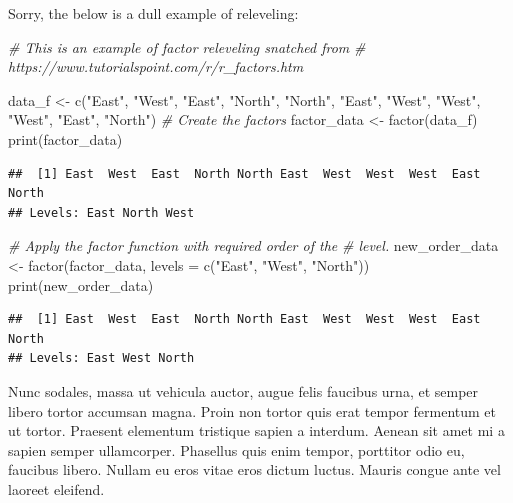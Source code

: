 \documentclass[]{elsarticle} %
\newenvironment{Shaded}{\begin{snugshade}}{\end{snugshade}}
\newcommand{\AttributeTok}[1]{\textcolor[rgb]{0.77,0.63,0.00}{#1}}
\newcommand{\CommentTok}[1]{\textcolor[rgb]{0.56,0.35,0.01}{\textit{#1}}}
\newcommand{\FunctionTok}[1]{\textcolor[rgb]{0.00,0.00,0.00}{#1}}
\newcommand{\NormalTok}[1]{#1}
\newcommand{\OtherTok}[1]{\textcolor[rgb]{0.56,0.35,0.01}{#1}}
\newcommand{\StringTok}[1]{\textcolor[rgb]{0.31,0.60,0.02}{#1}}
\begin{document}
Sorry, the below is a dull example of releveling:

\begin{Shaded}
\begin{Highlighting}[]
\CommentTok{\# This is an example of factor releveling snatched from}
\CommentTok{\# https://www.tutorialspoint.com/r/r\_factors.htm}

\NormalTok{data\_f }\OtherTok{\textless{}{-}} \FunctionTok{c}\NormalTok{(}\StringTok{"East"}\NormalTok{, }\StringTok{"West"}\NormalTok{, }\StringTok{"East"}\NormalTok{, }\StringTok{"North"}\NormalTok{, }\StringTok{"North"}\NormalTok{, }\StringTok{"East"}\NormalTok{,}
    \StringTok{"West"}\NormalTok{, }\StringTok{"West"}\NormalTok{, }\StringTok{"West"}\NormalTok{, }\StringTok{"East"}\NormalTok{, }\StringTok{"North"}\NormalTok{)}
\CommentTok{\# Create the factors}
\NormalTok{factor\_data }\OtherTok{\textless{}{-}} \FunctionTok{factor}\NormalTok{(data\_f)}
\FunctionTok{print}\NormalTok{(factor\_data)}
\end{Highlighting}
\end{Shaded}

\begin{verbatim}
##  [1] East  West  East  North North East  West  West  West  East  North
## Levels: East North West
\end{verbatim}

\begin{Shaded}
\begin{Highlighting}[]
\CommentTok{\# Apply the factor function with required order of the}
\CommentTok{\# level.}
\NormalTok{new\_order\_data }\OtherTok{\textless{}{-}} \FunctionTok{factor}\NormalTok{(factor\_data, }\AttributeTok{levels =} \FunctionTok{c}\NormalTok{(}\StringTok{"East"}\NormalTok{, }\StringTok{"West"}\NormalTok{,}
    \StringTok{"North"}\NormalTok{))}
\FunctionTok{print}\NormalTok{(new\_order\_data)}
\end{Highlighting}
\end{Shaded}

\begin{verbatim}
##  [1] East  West  East  North North East  West  West  West  East  North
## Levels: East West North
\end{verbatim}

Nunc sodales, massa ut vehicula auctor, augue felis faucibus urna, et
semper libero tortor accumsan magna. Proin non tortor quis erat tempor
fermentum et ut tortor. Praesent elementum tristique sapien a interdum.
Aenean sit amet mi a sapien semper ullamcorper. Phasellus quis enim
tempor, porttitor odio eu, faucibus libero. Nullam eu eros vitae eros
dictum luctus. Mauris congue ante vel laoreet eleifend.
\end{document}
